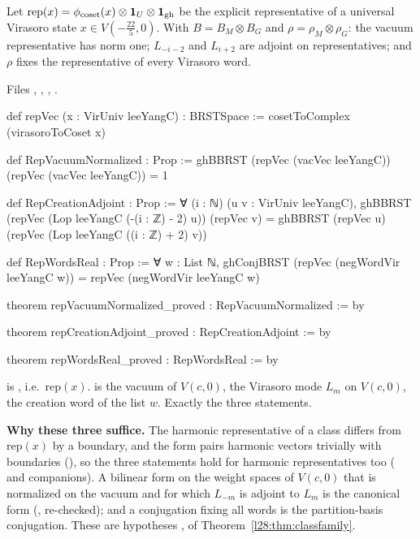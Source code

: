 \begin{theorem}\label{l28:thm:repmetric}
Let $\mathrm{rep}(x)=\phi_{\mathrm{coset}}(x)\otimes\mathbf 1_U\otimes\mathbf 1_{\mathrm{gh}}$ be the explicit representative of a universal
Virasoro state $x\in V(-\tfrac{22}5,0)$. With $B=B_M\otimes B_G$ and $\rho=\rho_M\otimes\rho_G$: the vacuum representative has norm one;
$L_{-i-2}$ and $L_{i+2}$ are adjoint on representatives; and $\rho$ fixes the representative of every Virasoro word.
\end{theorem}

\noindent Files , ,
, .
\begin{leancode}
def repVec (x : VirUniv leeYangC) : BRSTSpace := cosetToComplex (virasoroToCoset x)

def RepVacuumNormalized : Prop := ghBBRST (repVec (vacVec leeYangC)) (repVec (vacVec leeYangC)) = 1

def RepCreationAdjoint : Prop :=
  ∀ (i : ℕ) (u v : VirUniv leeYangC),
    ghBBRST (repVec (Lop leeYangC (-(i : ℤ) - 2) u)) (repVec v) =
      ghBBRST (repVec u) (repVec (Lop leeYangC ((i : ℤ) + 2) v))

def RepWordsReal : Prop :=
  ∀ w : List ℕ, ghConjBRST (repVec (negWordVir leeYangC w)) = repVec (negWordVir leeYangC w)

theorem repVacuumNormalized_proved : RepVacuumNormalized := by

theorem repCreationAdjoint_proved : RepCreationAdjoint := by

theorem repWordsReal_proved : RepWordsReal := by
\end{leancode}

\begin{dictionary}
 is , i.e.\ $\mathrm{rep}(x)$.  is the vacuum of $V(c,0)$,
 the Virasoro mode $L_m$ on $V(c,0)$,  the creation word of the list $w$. Exactly the three statements.

\textbf{Why these three suffice.} The harmonic representative of a class differs from $\mathrm{rep}(x)$ by a boundary, and the form pairs harmonic
vectors trivially with boundaries (), so the three statements hold for harmonic representatives too
( and companions). A bilinear form on the weight spaces of $V(c,0)$ that is normalized on the vacuum and for which
$L_{-m}$ is adjoint to $L_m$ is the canonical form (, re-checked); and a conjugation fixing all words is
the partition-basis conjugation. These are hypotheses ,  of Theorem~\ref{l28:thm:classfamily}.
\end{dictionary}


